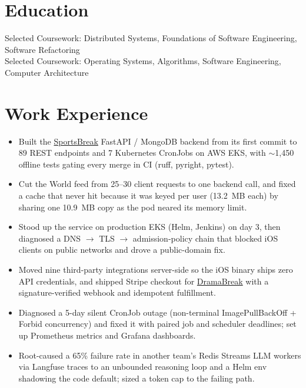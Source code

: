\documentclass[11pt, letterpaper]{article}
\begin{document}

\section{Education}
Selected Coursework: Distributed Systems, Foundations of Software Engineering, Software Refactoring\\[1pt]
Selected Coursework: Operating Systems, Algorithms, Software Engineering, Computer Architecture

\section{Work Experience}
\begin{itemize}
  \item Built the \href{https://apps.apple.com/app/id6762649287}{SportsBreak} FastAPI / MongoDB backend from its first commit to 89 REST endpoints and 7 Kubernetes CronJobs on AWS EKS, with $\sim$1{,}450 offline tests gating every merge in CI (ruff, pyright, pytest).
  \item Cut the World feed from 25--30 client requests to one backend call, and fixed a cache that never hit because it was keyed per user (13.2~MB each) by sharing one 10.9~MB copy as the pod neared its memory limit.
  \item Stood up the service on production EKS (Helm, Jenkins) on day 3, then diagnosed a DNS $\to$ TLS $\to$ admission-policy chain that blocked iOS clients on public networks and drove a public-domain fix.
  \item Moved nine third-party integrations server-side so the iOS binary ships zero API credentials, and shipped Stripe checkout for \href{https://apps.apple.com/app/id6758861738}{DramaBreak} with a signature-verified webhook and idempotent fulfillment.
  \item Diagnosed a 5-day silent CronJob outage (non-terminal ImagePullBackOff + Forbid concurrency) and fixed it with paired job and scheduler deadlines; set up Prometheus metrics and Grafana dashboards.
  \item Root-caused a 65\% failure rate in another team's Redis Streams LLM workers via Langfuse traces to an unbounded reasoning loop and a Helm env shadowing the code default; sized a token cap to the failing path.
\end{itemize}
\end{document}
